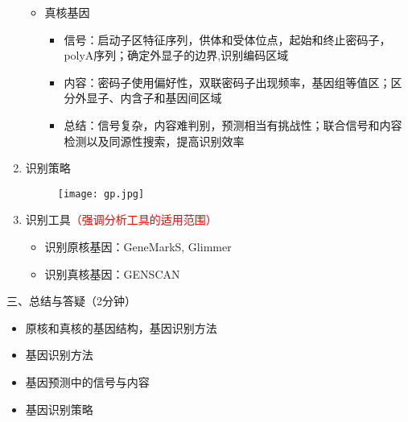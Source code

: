 \documentclass{TIJMUjiaoanLL}
\begin{document}
\begin{enumerate}
\otherTail
\newpage
\otherHeader


    \begin{itemize}
      \item 真核基因
       \begin{itemize}
        \item 信号：启动子区特征序列，供体和受体位点，起始和终止密码子，polyA序列；确定外显子的边界,识别编码区域
        \item 内容：密码子使用偏好性，双联密码子出现频率，基因组等值区；区分外显子、内含子和基因间区域
        \item 总结：信号复杂，内容难判别，预测相当有挑战性；联合信号和内容检测以及同源性搜索，提高识别效率
       \end{itemize}
    \end{itemize}
  \item 识别策略
    \begin{figure}[h]
      \centering
      \texttt{[image: gp.jpg]}
    \end{figure}
  \item 识别工具\textcolor{red}{（强调分析工具的适用范围）}
    \begin{itemize}
      \item 识别原核基因：GeneMarkS, Glimmer
      \item 识别真核基因：GENSCAN
    \end{itemize}
\end{enumerate}

\vspace*{0.2cm}
\noindent
三、总结与答疑（2分钟）
\begin{itemize}
  \item 原核和真核的基因结构，基因识别方法
  \item 基因识别方法
  \item 基因预测中的信号与内容
  \item 基因识别策略
\end{itemize}


\otherTail
\end{document}
